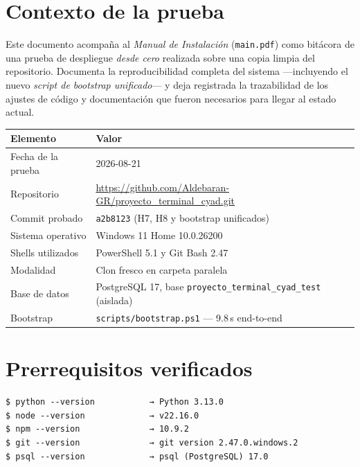 \documentclass{computacion}
\begin{document}
\portada
\setcounter{page}{1}
\pagestyle{fancy}

\section{Contexto de la prueba}

Este documento acompaña al \emph{Manual de Instalación} (\texttt{main.pdf}) como bitácora de una prueba de despliegue \emph{desde cero} realizada sobre una copia limpia del repositorio. Documenta la reproducibilidad completa del sistema —incluyendo el nuevo \emph{script de bootstrap unificado}— y deja registrada la trazabilidad de los ajustes de código y documentación que fueron necesarios para llegar al estado actual.

\begin{longtable}{p{} p{}}
    \toprule
    \textbf{Elemento} & \textbf{Valor} \\
    \midrule
    \endhead
    Fecha de la prueba          & 2026-08-21 \\
    Repositorio                 & \url{https://github.com/Aldebaran-GR/proyecto_terminal_cyad.git} \\
    Commit probado              & \texttt{a2b8123} (H7, H8 y bootstrap unificados) \\
    Sistema operativo           & Windows 11 Home 10.0.26200 \\
    Shells utilizados           & PowerShell 5.1 y Git Bash 2.47 \\
    Modalidad                   & Clon fresco en carpeta paralela \\
    Base de datos               & PostgreSQL 17, base \texttt{proyecto\_terminal\_cyad\_test} (aislada) \\
    Bootstrap                   & \texttt{scripts/bootstrap.ps1} — 9.8\,s end-to-end \\
    \bottomrule
\end{longtable}

\section{Prerrequisitos verificados}

\begin{Verbatim}[fontsize=\small, frame=single]
$ python --version           → Python 3.13.0
$ node --version             → v22.16.0
$ npm --version              → 10.9.2
$ git --version              → git version 2.47.0.windows.2
$ psql --version             → psql (PostgreSQL) 17.0
\end{Verbatim}
\end{document}
